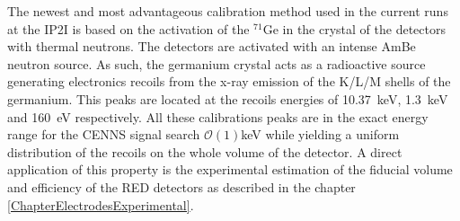 The newest and most advantageous calibration method used in the current runs at the IP2I is based on the activation of the $^{71}$Ge in the crystal of the detectors with thermal neutrons. The detectors are activated with an intense AmBe neutron source. As such, the germanium crystal acts as a radioactive source generating electronics recoils from the x-ray emission of the K/L/M shells of the germanium. This peaks are located at the recoils energies of \SI{10.37}{\kilo\eV}, \SI{1.3}{\kilo\eV} and \SI{160}{\eV} respectively. All these calibrations peaks are in the exact energy range for the CENNS signal search $\mathcal{O}(1)$\si{\kilo\eV} while yielding a uniform distribution of the recoils on the whole volume of the detector. A direct application of this property is the experimental estimation of the fiducial volume and efficiency of the RED detectors as described in the chapter \ref{ChapterElectrodesExperimental}.



%
%
%
